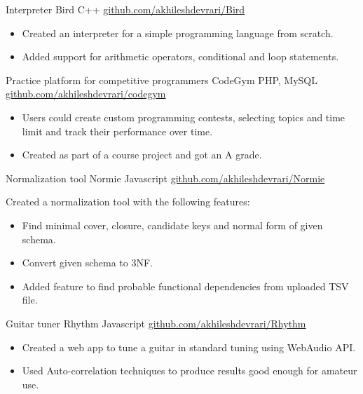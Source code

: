 \documentclass[]{awesome-cv}
\begin{document}
\vspace{-7mm}
\begin{cventries}
	\cventry
	{Interpreter}
	{Bird}
	{C++}
	{\href{https://github.com/akhileshdevrari/Bird}{github.com/akhileshdevrari/Bird}}
	{
		\vspace{-3mm}
		\begin{itemize}
			\item Created an interpreter for a simple programming language from scratch.
			\item Added support for arithmetic operators, conditional and loop statements.
		\end{itemize}		
	}
	
	\vspace{-2mm}
	\cventry
	{Practice platform for competitive programmers}
	{CodeGym}
	{PHP, MySQL}
	{\href{https://github.com/akhileshdevrari/codegym}{github.com/akhileshdevrari/codegym}}
	{
		\vspace{-3mm}
		\begin{itemize}
			\item Users could create custom programming contests, selecting topics and time limit and track their performance over time.
			\item Created as part of a course project and got an A grade.
		\end{itemize}
	}
	
	
	\vspace{-2mm}
	\cventry
	{Normalization tool}
	{Normie}
	{Javascript}
	{\href{https://github.com/akhileshdevrari/Normie}{github.com/akhileshdevrari/Normie}}
	{
		Created a normalization tool with the following features:
		\begin{itemize}
			\item Find minimal cover, closure, candidate keys and normal form of given schema.
			\item Convert given schema to 3NF.
			\item Added feature to find probable functional dependencies from uploaded TSV file.
		\end{itemize}
	}
	
	\vspace{-2mm}
	\cventry
	{Guitar tuner}
	{Rhythm}
	{Javascript}
	{\href{https://github.com/akhileshdevrari/Rhythm}{github.com/akhileshdevrari/Rhythm}}
	{
		\vspace{-3mm}
		\begin{itemize}
		\item Created a web app to tune a guitar in standard tuning using WebAudio API.
		\item Used Auto-correlation techniques to produce results good enough for amateur use.
		\end{itemize}	
	}
	
\end{cventries}
\end{document}
